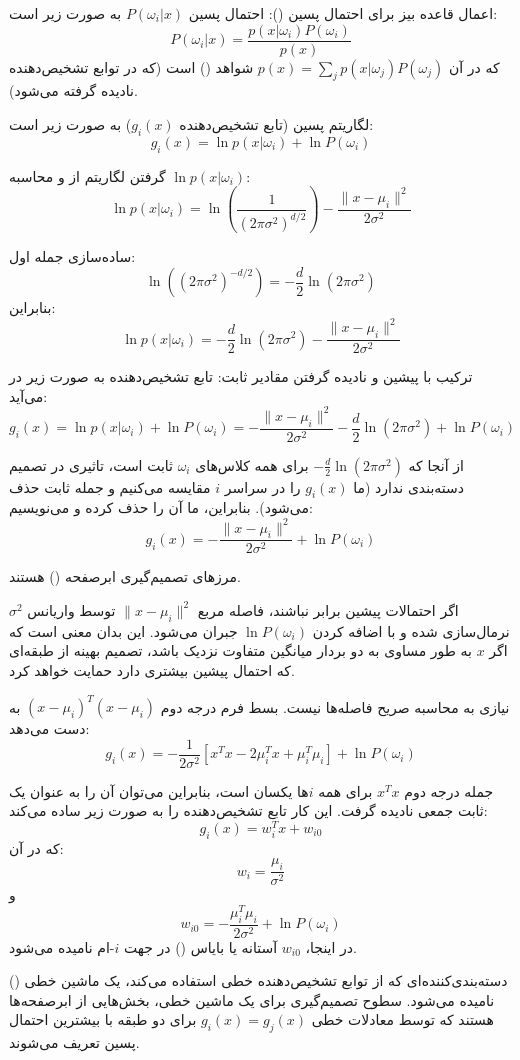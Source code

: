 \documentclass{article}
\begin{document}
اعمال قاعده بیز برای احتمال پسین ():
احتمال پسین $P(\omega_i|x)$ به صورت زیر است:
\[
P(\omega_i|x) = \frac{p(x|\omega_i)P(\omega_i)}{p(x)}
\]
که در آن $p(x) = \sum_j p(x|\omega_j)P(\omega_j)$ شواهد () است (که در توابع تشخیص‌دهنده نادیده گرفته می‌شود).

لگاریتم پسین (تابع تشخیص‌دهنده $g_i(x)$) به صورت زیر است:
\[
g_i(x) = \ln p(x|\omega_i) + \ln P(\omega_i)
\]

گرفتن لگاریتم از  و محاسبه $\ln p(x|\omega_i)$:
\[
\ln p(x|\omega_i) = \ln\left( \frac{1}{(2\pi\sigma^2)^{d/2}} \right) - \frac{\|x-\mu_i\|^2}{2\sigma^2}
\]

ساده‌سازی جمله اول:
\[
\ln((2\pi\sigma^2)^{-d/2}) = -\frac{d}{2} \ln(2\pi\sigma^2)
\]
بنابراین:
\[
\ln p(x|\omega_i) = -\frac{d}{2} \ln(2\pi\sigma^2) - \frac{\|x-\mu_i\|^2}{2\sigma^2}
\]

ترکیب با پیشین و نادیده گرفتن مقادیر ثابت:
تابع تشخیص‌دهنده به صورت زیر در می‌آید:
\[
g_i(x) = \ln p(x|\omega_i) + \ln P(\omega_i) = -\frac{\|x-\mu_i\|^2}{2\sigma^2} - \frac{d}{2} \ln(2\pi\sigma^2) + \ln P(\omega_i)
\]

از آنجا که $-\frac{d}{2} \ln(2\pi\sigma^2)$ برای همه کلاس‌های $\omega_i$ ثابت است، تاثیری در تصمیم دسته‌بندی ندارد (ما $g_i(x)$ را در سراسر $i$ مقایسه می‌کنیم و جمله ثابت حذف می‌شود). بنابراین، ما آن را حذف کرده و می‌نویسیم:
\[
g_i(x) = -\frac{\|x-\mu_i\|^2}{2\sigma^2} + \ln P(\omega_i)
\]

مرزهای تصمیم‌گیری ابرصفحه () هستند.

اگر احتمالات پیشین برابر نباشند، فاصله مربع $\|x-\mu_i\|^2$ توسط واریانس $\sigma^2$ نرمال‌سازی شده و با اضافه کردن $\ln P(\omega_i)$ جبران می‌شود. این بدان معنی است که اگر $x$ به طور مساوی به دو بردار میانگین متفاوت نزدیک باشد، تصمیم بهینه از طبقه‌ای که احتمال پیشین بیشتری دارد حمایت خواهد کرد.

نیازی به محاسبه صریح فاصله‌ها نیست. بسط فرم درجه دوم $(x-\mu_i)^T(x-\mu_i)$ به دست می‌دهد:
\[
g_i(x) = -\frac{1}{2\sigma^2} [x^T x - 2\mu_i^T x + \mu_i^T \mu_i] + \ln P(\omega_i)
\]

جمله درجه دوم $x^T x$ برای همه $i$ها یکسان است، بنابراین می‌توان آن را به عنوان یک ثابت جمعی نادیده گرفت. این کار تابع تشخیص‌دهنده را به صورت زیر ساده می‌کند:
\[
g_i(x) = w_i^T x + w_{i0}
\]
که در آن:
\[
w_i = \frac{\mu_i}{\sigma^2}
\]
و
\[
w_{i0} = -\frac{\mu_i^T \mu_i}{2\sigma^2} + \ln P(\omega_i)
\]
در اینجا، $w_{i0}$ آستانه یا بایاس () در جهت $i$-ام نامیده می‌شود.

دسته‌بندی‌کننده‌ای که از توابع تشخیص‌دهنده خطی استفاده می‌کند، یک ماشین خطی () نامیده می‌شود. سطوح تصمیم‌گیری برای یک ماشین خطی، بخش‌هایی از ابرصفحه‌ها هستند که توسط معادلات خطی $g_i(x) = g_j(x)$ برای دو طبقه با بیشترین احتمال پسین تعریف می‌شوند.
\end{document}
